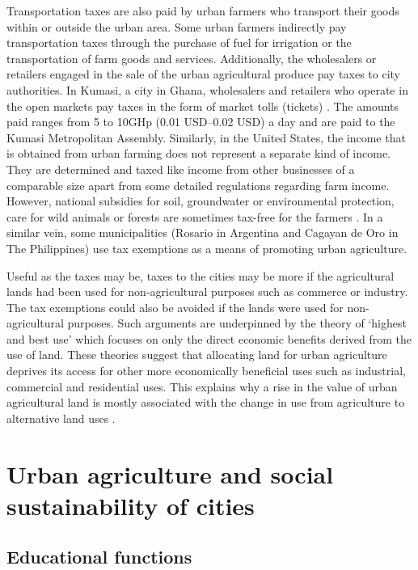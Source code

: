 Transportation taxes are also paid by urban farmers who transport their goods within or outside the urban area. Some urban farmers indirectly pay transportation taxes through the purchase of fuel for irrigation or the transportation of farm goods and services. Additionally, the wholesalers or retailers engaged in the sale of the urban agricultural produce pay taxes to city authorities. In Kumasi, a city in Ghana, wholesalers and retailers who operate in the open markets pay taxes in the form of market tolls (tickets) \cite{Baah-Ennumh2012}. The amounts paid ranges from 5 to 10GHp (0.01 USD–0.02 USD) a day and are paid to the Kumasi Metropolitan Assembly. Similarly, in the United States, the income that is obtained from urban farming does not represent a separate kind of income. They are determined and taxed like income from other businesses of a comparable size apart from some detailed regulations regarding farm income. However, national subsidies for soil, groundwater or environmental protection, care for wild animals or forests are sometimes tax-free for the farmers \cite{Andersen2002}. In a similar vein, some municipalities (Rosario in Argentina and Cagayan de Oro in The Philippines) use tax exemptions as a means of promoting urban agriculture.

Useful as the taxes may be, taxes to the cities may be more if the agricultural lands had been used for non-agricultural purposes such as commerce or industry. The tax exemptions could also be avoided if the lands were used for non-agricultural purposes. Such arguments are underpinned by the theory of ‘highest and best use’ which focuses on only the direct economic benefits derived from the use of land. These theories suggest that allocating land for urban agriculture deprives its access for other more economically beneficial uses such as industrial, commercial and residential uses. This explains why a rise in the value of urban agricultural land is mostly associated with the change in use from agriculture to alternative land uses \cite{Nugent2000}.

\section{Urban agriculture and social sustainability of cities}

\subsection{Educational functions}

